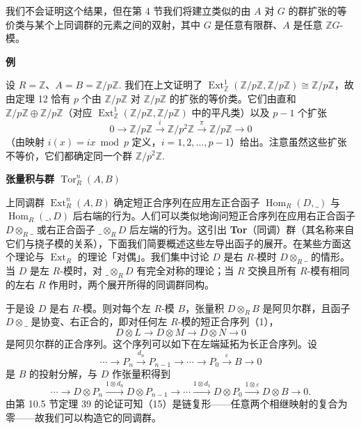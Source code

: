 我们不会证明这个结果，但在第 4 节我们将建立类似的由 \(A\) 对 \(G\) 的群扩张的等价类与某个上同调群的元素之间的双射，其中 \(G\) 是任意有限群、\(A\) 是任意 \(\mathbb{Z}G\)-模。

\noindent\textbf{例}

设 \(R = \mathbb{Z}\)、\(A = B = \mathbb{Z}/p\mathbb{Z}\). 我们在上文证明了 \(\operatorname{Ext}_{\mathbb{Z}}^1(\mathbb{Z}/p\mathbb{Z}, \mathbb{Z}/p\mathbb{Z}) \cong \mathbb{Z}/p\mathbb{Z}\)，故由定理 12 恰有 \(p\) 个由 \(\mathbb{Z}/p\mathbb{Z}\) 对 \(\mathbb{Z}/p\mathbb{Z}\) 的扩张的等价类。它们由直和 \(\mathbb{Z}/p\mathbb{Z} \oplus \mathbb{Z}/p\mathbb{Z}\)（对应 \(\operatorname{Ext}_{\mathbb{Z}}^1(\mathbb{Z}/p\mathbb{Z}, \mathbb{Z}/p\mathbb{Z})\) 中的平凡类）以及 \(p-1\) 个扩张
\[
0 \to \mathbb{Z}/p\mathbb{Z} \xrightarrow{i} \mathbb{Z}/p^2\mathbb{Z} \xrightarrow{\pi} \mathbb{Z}/p\mathbb{Z} \to 0
\]
（由映射 \(i(x) = ix \bmod p\) 定义，\(i = 1, 2, \ldots, p-1\)）给出。注意虽然这些扩张不等价，它们都确定同一个群 \(\mathbb{Z}/p^2\mathbb{Z}\).

\noindent\textbf{张量积与群 \(\operatorname{Tor}_R^n(A,B)\)}

上同调群 \(\operatorname{Ext}_R^n(A, B)\) 确定短正合序列在应用左正合函子 \(\operatorname{Hom}_R(D, \_)\) 与 \(\operatorname{Hom}_R(\_, D)\) 后右端的行为。人们可以类似地询问短正合序列在应用右正合函子 \(D \otimes_R \_\) 或右正合函子 \(\_ \otimes_R D\) 后左端的行为。这引出 \textbf{Tor}（同调）群（其名称来自它们与挠子模的关系），下面我们简要概述这些左导出函子的展开。在某些方面这个理论与 \(\operatorname{Ext}_R\) 的理论「对偶」。我们集中讨论 \(D\) 是右 \(R\)-模时 \(D \otimes_R \_\) 的情形。当 \(D\) 是左 \(R\)-模时，对 \(\_ \otimes_R D\) 有完全对称的理论；当 \(R\) 交换且所有 \(R\)-模有相同的左右 \(R\) 作用时，两个展开所得的同调群同构。

于是设 \(D\) 是右 \(R\)-模。则对每个左 \(R\)-模 \(B\)，张量积 \(D \otimes_RB\) 是阿贝尔群，且函子 \(D \otimes \_\) 是协变、右正合的，即对任何左 \(R\)-模的短正合序列（1），
\[
D \otimes L \longrightarrow D \otimes M \longrightarrow D \otimes N \longrightarrow 0
\]
是阿贝尔群的正合序列。这个序列可以如下在左端延拓为长正合序列。设
\[
\cdots \longrightarrow P_n \xrightarrow{d_n} P_{n-1} \longrightarrow \cdots \longrightarrow P_0 \xrightarrow{\varepsilon} B \longrightarrow 0
\]
是 \(B\) 的投射分解，与 \(D\) 作张量积得到
\[
\cdots \to D \otimes P_n \xrightarrow{1 \otimes d_n} D \otimes P_{n-1} \to \cdots \xrightarrow{1 \otimes d_1} D \otimes P_0 \xrightarrow{1 \otimes \varepsilon} D \otimes B \to 0. \tag{17.15}
\]
由第 10.5 节定理 39 的论证可知（15）是链复形——任意两个相继映射的复合为零——故我们可以构造它的同调群。

